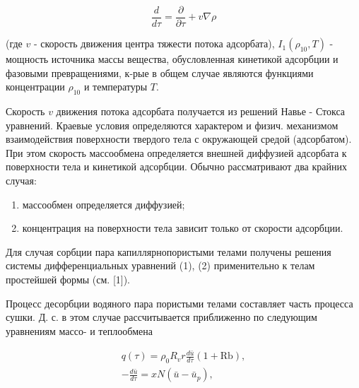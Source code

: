 \documentclass[10pt]{article}
\begin{document}
\[

\frac{d}{d \tau}=\frac{\partial}{\partial \tau}+v \nabla \rho

\]



(где $v$ - скорость движения центра тяжести потока адсорбата), $I_{1}\left(\rho_{10}, T\right)$ - мощность источника массы вещества, обусловленная кинетикой адсорбции и фазовыми превращениями, к-рые в общем случае являются функциями концентрации $\rho_{10}$ и температуры $T$.



Скорость $v$ движения потока адсорбата получается из решений Навье - Стокса уравнений. Краевые условия определяются характером и физич. механизмом взаимодействия поверхности твердого тела с окружающей средой (адсорбатом). При этом скорость массообмена определяется внешней диффузией адсорбата к поверхности тела и кинетикой адсорбции. Обычно рассматривают два крайних случая:



\begin{enumerate}

  \item массообмен определяется диффузией;



  \item концентрация на поверхности тела зависит только от скорости адсорбции.



\end{enumerate}



Для случая сорбции пара капиллярнопористыми телами получены решения системы дифференциальных уравнений (1), (2) применительно к телам простейшей формы (см. [1]).



Процесс десорбции водяного пара пористыми телами составляет часть процесса сушки. Д. с. в этом случае рассчитывается приближенно по следующим уравнениям массо- и теплообмена



\[

\begin{gathered}

q(\tau)=\rho_{0} R_{v} r \frac{d \bar{u}}{d \tau}(1+\mathrm{Rb}), \\

-\frac{d \bar{u}}{d \tau}=x N\left(\bar{u}-\bar{u}_{p}\right),

\end{gathered}

\]
\end{document}

